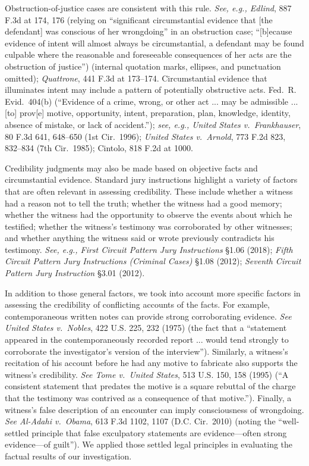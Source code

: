 Obstruction-of-justice cases are consistent with this rule.
\textit{See, e.g., Edlind}, 887 F.3d at 174, 176 (relying on “significant circumstantial evidence that [the defendant] was conscious of her wrongdoing” in an obstruction case; “[b]ecause evidence of intent will almost always be circumstantial, a defendant may be found culpable where the reasonable and foreseeable consequences of her acts are the obstruction of justice”) (internal quotation marks, ellipses, and punctuation omitted);
\textit{Quattrone}, 441 F.3d at 173--174.
Circumstantial evidence that illuminates intent may include a pattern of potentially obstructive acts. Fed.~R. Evid.~404(b) (“Evidence of a crime, wrong, or other act ... may be admissible ... [to] prov[e] motive, opportunity, intent, preparation, plan, knowledge, identity, absence of mistake, or lack of accident.”);
\textit{see, e.g., United States v.\ Frankhauser}, 80 F.3d 641, 648--650 (1st Cir.~1996);
\textit{United States v.\ Arnold}, 773 F.2d 823, 832--834 (7th Cir.~1985);
Cintolo, 818 F.2d at 1000.

Credibility judgments may also be made based on objective facts and circumstantial evidence.
Standard jury instructions highlight a variety of factors that are often relevant in assessing credibility.
These include whether a witness had a reason not to tell the truth; whether the witness had a good memory;
whether the witness had the opportunity to observe the events about which he testified;
whether the witness’s testimony was corroborated by other witnesses;
and whether anything the witness said or wrote previously contradicts his testimony.
\textit{See, e.g., First Circuit Pattern Jury Instructions} \S 1.06 (2018);
\textit{Fifth Circuit Pattern Jury Instructions (Criminal Cases)} \S 1.08 (2012);
\textit{Seventh Circuit Pattern Jury Instruction} \S 3.01 (2012).

In addition to those general factors, we took into account more specific factors in assessing the credibility of conflicting accounts of the facts.
For example, contemporaneous written notes can provide strong corroborating evidence.
\textit{See United States v.\ Nobles}, 422 U.S. 225, 232 (1975) (the fact that a “statement appeared in the contemporaneously recorded report ... would tend strongly to corroborate the investigator’s version of the interview”).
Similarly, a witness’s recitation of his account before he had any motive to fabricate also supports the witness’s credibility.
\textit{See Tome v.\ United States}, 513 U.S. 150, 158 (1995) (“A consistent statement that predates the motive is a square rebuttal of the charge that the testimony was contrived as a consequence of that motive.”).
Finally, a witness’s false description of an encounter can imply consciousness of wrongdoing.
\textit{See Al-Adahi v.\ Obama}, 613 F.3d 1102, 1107 (D.C. Cir.~2010) (noting the “well-settled principle that false exculpatory statements are evidence---often strong evidence---of guilt”).
We applied those settled legal principles in evaluating the factual results of our investigation.
